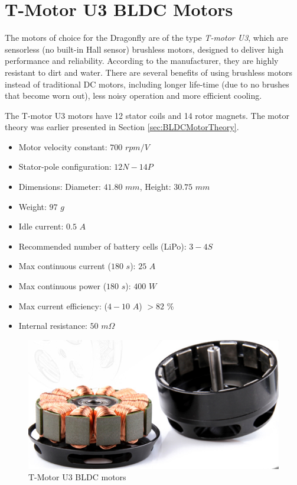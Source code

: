 \documentclass[a4paper]{report}
\begin{document}
	\section{T-Motor U3 BLDC Motors}
The motors of choice for the Dragonfly are of the type \emph{T-motor U3}, which are sensorless (no built-in Hall sensor) brushless motors, designed to deliver high performance and reliability. According to the manufacturer, they are highly resistant to dirt and water. There are several benefits of using brushless motors instead of traditional DC motors, including longer life-time (due to no brushes that become worn out), less noisy operation and more efficient cooling.

The T-motor U3 motors have 12 stator coils and 14 rotor magnets. The motor theory was earlier presented in Section \ref{sec:BLDCMotorTheory}.

\begin{itemize}
  \item Motor velocity constant: $700$ $rpm/V$
  \item Stator-pole configuration: $12N-14P$
  \item Dimensions: Diameter: $41.80$ $mm$, Height: $30.75$ $mm$
  \item Weight: $97$ $g$
  \item Idle current: $0.5$ $A$
  \item Recommended number of battery cells (LiPo): $3-4S$
  \item Max continuous current ($180$ $s$): $25$ $A$
  \item Max continuous power ($180$ $s$): $400$ $W$
  \item Max current efficiency: ($4-10$ $A$) $>82$ \%
  \item Internal resistance: $50$ $m\Omega$
\end{itemize}

\begin{figure}
    \centering
    \includegraphics[scale=0.6]{images/tmotoru3open.png}
    \caption{T-Motor U3 BLDC motors}
    \label{fig:tmotoru3open}
\end{figure}
\end{document}
